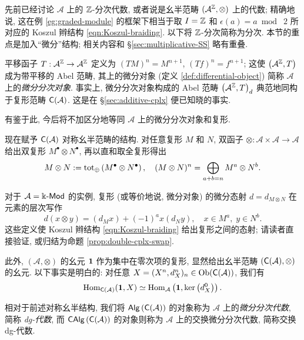 先前已经讨论 $\mathcal{A}$ 上的 $\mathbb{Z}$-分次代数, 或者说是幺半范畴 $(\mathcal{A}^{\mathbb{Z}}, \otimes)$ 上的代数; 精确地说, 这在例 \ref{eg:graded-module} 的框架下相当于取 $I = \mathbb{Z}$ 和 $\epsilon(a) = a \bmod\; 2$ 所对应的 Koszul 辫结构 \eqref{eqn:Koszul-braiding}. 以下将 $\mathbb{Z}$-分次简称为分次. 本节的重点是加入``微分''结构; 相关内容和 \S\ref{sec:multiplicative-SS} 略有重叠.

平移函子 $T: \mathcal{A}^{\mathbb{Z}} \to \mathcal{A}^{\mathbb{Z}}$ 定义为 $(TM)^n = M^{n+1}$, $(Tf)^n = f^{n+1}$; 这使 $\left(\mathcal{A}^{\mathbb{Z}}, T\right)$ 成为带平移的 Abel 范畴, 其上的微分对象 (定义 \ref{def:differential-object}) 简称 $\mathcal{A}$ 上的\emph{微分分次对象}. 事实上, 微分分次对象构成的 Abel 范畴 $\left(\mathcal{A}^{\mathbb{Z}}, T\right)_d$ 典范地同构于复形范畴 $\mathsf{C}(\mathcal{A})$. 这是在 \S\ref{sec:additive-cplx} 便已知晓的事实.

有鉴于此, 今后将不加区分地等同 $\mathcal{A}$ 上的微分分次对象和复形.

现在赋予 $\mathsf{C}(\mathcal{A})$ 对称幺半范畴的结构. 对任意复形 $M$ 和 $N$, 双函子 $\otimes: \mathcal{A} \times \mathcal{A} \to \mathcal{A}$ 给出双复形 $M^\bullet \otimes N^\bullet$, 再以直和取全复形得出
\[ M \otimes N := \operatorname{tot}_{\oplus}\left( M^\bullet \otimes N^\bullet \right), \quad (M \otimes N)^n = \bigoplus_{a+b=n} M^a \otimes N^b. \]

对于 $\mathcal{A} = \Bbbk\text{-}\mathsf{Mod}$ 的实例, 复形 (或等价地说, 微分对象) 的微分态射 $d = d_{M \otimes N}$ 在元素的层次写作
\begin{equation*}
	d(x \otimes y) = (d_M x) + (-1)^a x (d_N y), \quad x \in M^a, \; y \in N^b.
\end{equation*}
这些定义使 Koszul 辫结构 \eqref{eqn:Koszul-braiding} 给出复形之间的态射; 请读者直接验证, 或归结为命题 \ref{prop:double-cplx-swap}.

此外, $(\mathcal{A}, \otimes)$ 的幺元 $\bm{1}$ 作为集中在零次项的复形, 显然给出幺半范畴 $(\mathsf{C}(\mathcal{A}), \otimes)$ 的幺元. 以下事实是明白的: 对任意 $X = (X^n, d_X^n)_n \in \operatorname{Ob}(\mathsf{C}(\mathcal{A}))$, 我们有
\begin{equation}\label{eqn:unit-map-into-cplx}
	\operatorname{Hom}_{\mathsf{C}(\mathcal{A})}(\bm{1}, X) \simeq \operatorname{Hom}_{\mathcal{A}}\left( \bm{1}, \operatorname{ker}\left(d_X^0 \right) \right).
\end{equation}

\begin{definition}\label{def:dg-algebra}
	相对于前述对称幺半结构, 我们将 $\mathsf{Alg}\left(\mathsf{C}(\mathcal{A})\right)$ 的对象称为 $\mathcal{A}$ 上的\emph{微分分次代数}, 简称 \emph{dg-代数}, 而 $\mathsf{CAlg}\left(\mathsf{C}(\mathcal{A})\right)$ 的对象则称为 $\mathcal{A}$ 上的交换微分分次代数, 简称交换 dg-代数.
\end{definition}

